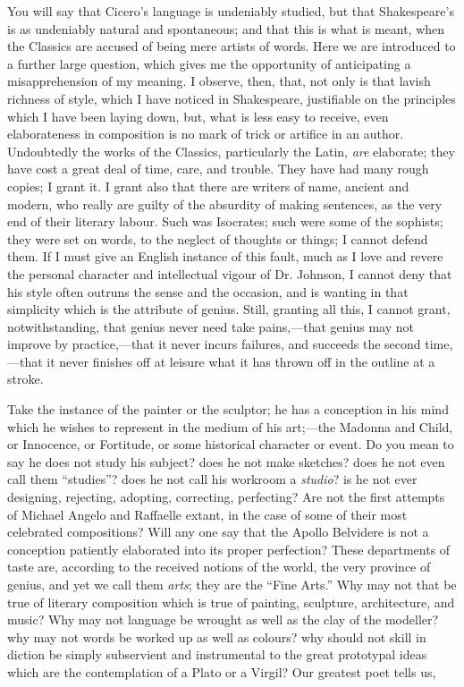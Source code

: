 You will say that Cicero's language is undeniably studied, but that
Shakespeare's is as undeniably natural and spontaneous; and that this
is what is meant, when the Classics are accused of being mere artists
of words. Here we are introduced to a further large question, which
gives me the opportunity of anticipating a misapprehension of my
meaning. I observe, then, that, not only is that lavish richness of
style, which I have noticed in Shakespeare, justifiable on the
principles which I have been laying down, but, what is less easy to
receive, even elaborateness in composition is no mark of trick or
artifice in an author. Undoubtedly the works of the Classics,
particularly the Latin, \emph{are} elaborate; they have cost a great
deal of time, care, and trouble. They have had many rough copies; I
grant it. I grant also that there are writers of name, ancient and
modern, who really are guilty of the absurdity of making sentences, as
the very end of their literary labour. Such was Isocrates; such were
some of the sophists; they were set on words, to the neglect of
thoughts or things; I cannot defend them. If I must give an
English instance of this fault, much as I love and revere the personal
character and intellectual vigour of Dr. Johnson, I cannot deny that
his style often outruns the sense and the occasion, and is wanting in
that simplicity which is the attribute of genius. Still, granting all
this, I cannot grant, notwithstanding, that genius never need take
pains,—that genius may not improve by practice,—that it never
incurs failures, and succeeds the second time,—that it never
finishes off at leisure what it has thrown off in the outline at a
stroke.

Take the instance of the painter or the sculptor; he has a
conception in his mind which he wishes to represent in the medium of
his art;—the Madonna and Child, or Innocence, or Fortitude, or some
historical character or event. Do you mean to say he does not study
his subject? does he not make sketches? does he not even call them
``studies''? does he not call his workroom a \emph{studio}? is
he not ever designing, rejecting, adopting, correcting, perfecting?
Are not the first attempts of Michael Angelo and Raffaelle extant, in
the case of some of their most celebrated compositions? Will any one
say that the Apollo Belvidere is not a conception patiently elaborated
into its proper perfection? These departments of taste are, according
to the received notions of the world, the very province of genius, and
yet we call them \emph{arts}; they are the ``Fine Arts.'' Why
may not that be true of literary composition which is true of
painting, sculpture, architecture, and music? Why may not language be
wrought as well as the clay of the modeller? why may not words be
worked up as well as colours? why should not skill in diction be
simply subservient and instrumental to the great prototypal ideas
which are the contemplation of a Plato or a Virgil? Our greatest poet
tells us,

